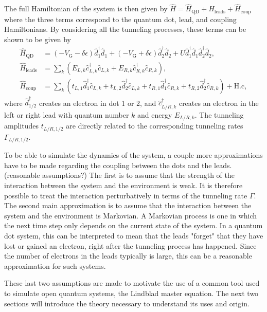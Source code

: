 \documentclass[../main.tex]{subfiles}
\begin{document}
The full Hamiltonian of the system is then given by $\hat H = \hat H_\text{QD} + \hat H_\text{leads} + \hat H_\text{coup}$ where the three terms correspond to the quantum dot, lead, and coupling Hamiltonians. By considering all the tunneling processes, these terms can be shown to be given by
\begin{equation}
    \begin{aligned}
        \hat H_\text{QD} &= (-V_\text{G} - \delta\epsilon) \hat d_1^\dag \hat d_1  +  (-V_\text{G} + \delta\epsilon)\hat d_2^\dag \hat d_2 + U\hat d_1^\dag \hat d_1 \hat d_2^\dag \hat d_2, \\
        \hat H_\text{leads} &= \sum_{k} (E_{L,k} \hat c_{L,k}^\dag \hat c_{L,k}  + E_{R,k} \hat c_{R,k}^\dag \hat c_{R,k}), \\
        \hat H_\text{coup} &= \sum_k (t_{L,1} \hat d_1^\dag \hat c_{L,k} + t_{L,2} \hat d_2^\dag \hat c_{L,k} + t_{R,1} \hat d_1^\dag \hat c_{R,k} + t_{R,2} \hat d_2^\dag \hat c_{R,k}) + \text{H.c},
    \end{aligned}
\end{equation}
where $\hat d_{1/2}^\dag$ creates an electron in dot 1 or 2, and $\hat c_{L/R,k}^\dag$ creates an electron in the left or right lead with quantum number $k$ and energy $E_{L/R,k}$. The tunneling amplitudes $t_{L/R,1/2}$ are directly related to the corresponding tunneling rates $\Gamma_{L/R,1/2}$. 

To be able to simulate the dynamics of the system, a couple more approximations have to be made regarding the coupling between the dots and the leads. (reasonable assumptions?) The first is to assume that the strength of the interaction between the system and the environment is weak. It is therefore possible to treat the interaction perturbatively in terms of the tunneling rate $\Gamma$. The second main approximation is to assume that the interaction between the system and the environment is Markovian. A Markovian process is one in which the next time step only depends on the current state of the system. In a quantum dot system, this can be interpreted to mean that the leads "forget" that they have lost or gained an electron, right after the tunneling process has happened. Since the number of electrons in the leads typically is large, this can be a reasonable approximation for such systems.

These last two assumptions are made to motivate the use of a common tool used to simulate open quantum systems, the Lindblad master equation. The next two sections will introduce the theory necessary to understand its uses and origin.
\end{document}
